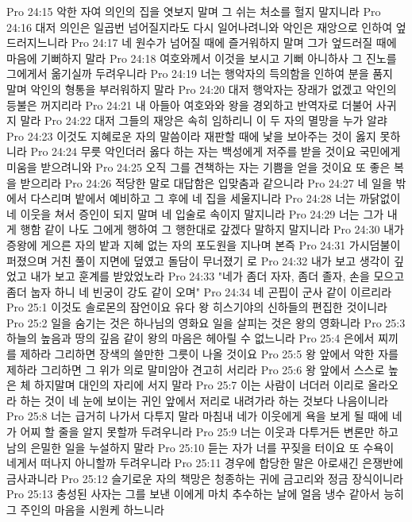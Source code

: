 Pro 24:15  악한 자여 의인의 집을 엿보지 말며 그 쉬는 처소를 헐지 말지니라
Pro 24:16  대저 의인은 일곱번 넘어질지라도 다시 일어나려니와 악인은 재앙으로 인하여 엎드러지느니라
Pro 24:17  네 원수가 넘어질 때에 즐거워하지 말며 그가 엎드러질 때에 마음에 기뻐하지 말라
Pro 24:18  여호와께서 이것을 보시고 기뻐 아니하사 그 진노를 그에게서 옮기실까 두려우니라
Pro 24:19  너는 행악자의 득의함을 인하여 분을 품지 말며 악인의 형통을 부러워하지 말라
Pro 24:20  대저 행악자는 장래가 없겠고 악인의 등불은 꺼지리라
Pro 24:21  내 아들아 여호와와 왕을 경외하고 반역자로 더불어 사귀지 말라
Pro 24:22  대저 그들의 재앙은 속히 임하리니 이 두 자의 멸망을 누가 알랴
Pro 24:23  이것도 지혜로운 자의 말씀이라 재판할 때에 낯을 보아주는 것이 옳지 못하니라
Pro 24:24  무릇 악인더러 옳다 하는 자는 백성에게 저주를 받을 것이요 국민에게 미움을 받으려니와
Pro 24:25  오직 그를 견책하는 자는 기쁨을 얻을 것이요 또 좋은 복을 받으리라
Pro 24:26  적당한 말로 대답함은 입맞춤과 같으니라
Pro 24:27  네 일을 밖에서 다스리며 밭에서 예비하고 그 후에 네 집을 세울지니라
Pro 24:28  너는 까닭없이 네 이웃을 쳐서 증인이 되지 말며 네 입술로 속이지 말지니라
Pro 24:29  너는 그가 내게 행함 같이 나도 그에게 행하여 그 행한대로 갚겠다 말하지 말지니라
Pro 24:30  내가 증왕에 게으른 자의 밭과 지혜 없는 자의 포도원을 지나며 본즉
Pro 24:31  가시덤불이 퍼졌으며 거친 풀이 지면에 덮였고 돌담이 무너졌기 로
Pro 24:32  내가 보고 생각이 깊었고 내가 보고 훈계를 받았었노라
Pro 24:33  "네가 좀더 자자, 좀더 졸자, 손을 모으고 좀더 눕자 하니 네 빈궁이 강도 같이 오며"
Pro 24:34  네 곤핍이 군사 같이 이르리라
Pro 25:1  이것도 솔로몬의 잠언이요 유다 왕 히스기야의 신하들의 편집한 것이니라
Pro 25:2  일을 숨기는 것은 하나님의 영화요 일을 살피는 것은 왕의 영화니라
Pro 25:3  하늘의 높음과 땅의 깊음 같이 왕의 마음은 헤아릴 수 없느니라
Pro 25:4  은에서 찌끼를 제하라 그리하면 장색의 쓸만한 그릇이 나올 것이요
Pro 25:5  왕 앞에서 악한 자를 제하라 그리하면 그 위가 의로 말미암아 견고히 서리라
Pro 25:6  왕 앞에서 스스로 높은 체 하지말며 대인의 자리에 서지 말라
Pro 25:7  이는 사람이 너더러 이리로 올라오라 하는 것이 네 눈에 보이는 귀인 앞에서 저리로 내려가라 하는 것보다 나음이니라
Pro 25:8  너는 급거히 나가서 다투지 말라 마침내 네가 이웃에게 욕을 보게 될 때에 네가 어찌 할 줄을 알지 못할까 두려우니라
Pro 25:9  너는 이웃과 다투거든 변론만 하고 남의 은밀한 일을 누설하지 말라
Pro 25:10  듣는 자가 너를 꾸짖을 터이요 또 수욕이 네게서 떠나지 아니할까 두려우니라
Pro 25:11  경우에 합당한 말은 아로새긴 은쟁반에 금사과니라
Pro 25:12  슬기로운 자의 책망은 청종하는 귀에 금고리와 정금 장식이니라
Pro 25:13  충성된 사자는 그를 보낸 이에게 마치 추수하는 날에 얼음 냉수 같아서 능히 그 주인의 마음을 시원케 하느니라
